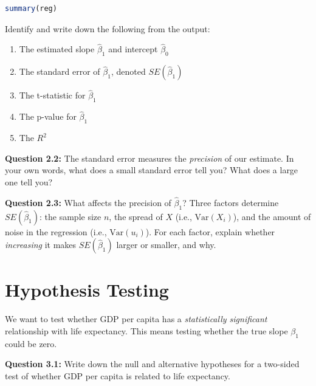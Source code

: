 \documentclass[11pt,letterpaper]{article}
\begin{document}
\begin{lstlisting}[language=R]
summary(reg)
\end{lstlisting}

\vspace{0.5cm}

Identify and write down the following from the output:

\begin{enumerate}[label=(\alph*)]
\item The estimated slope $\hat{\beta}_1$ and intercept $\hat{\beta}_0$
\item The standard error of $\hat{\beta}_1$, denoted $SE(\hat{\beta}_1)$
\item The t-statistic for $\hat{\beta}_1$
\item The p-value for $\hat{\beta}_1$
\item The $R^2$
\end{enumerate}

\vspace{2cm}

\textbf{Question 2.2:} The standard error measures the \textit{precision} of our estimate. In your own words, what does a small standard error tell you? What does a large one tell you?

\vspace{3cm}

\textbf{Question 2.3:} What affects the precision of $\hat{\beta}_1$? Three factors determine $SE(\hat{\beta}_1)$: the sample size $n$, the spread of $X$ (i.e., $\text{Var}(X_i)$), and the amount of noise in the regression (i.e., $\text{Var}(u_i)$). For each factor, explain whether \textit{increasing} it makes $SE(\hat{\beta}_1)$ larger or smaller, and why.

\vspace{4cm}

\section{Hypothesis Testing}

We want to test whether GDP per capita has a \textit{statistically significant} relationship with life expectancy. This means testing whether the true slope $\beta_1$ could be zero.

\textbf{Question 3.1:} Write down the null and alternative hypotheses for a two-sided test of whether GDP per capita is related to life expectancy.
\end{document}
